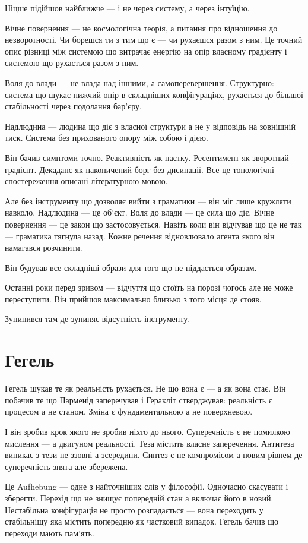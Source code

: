 \documentclass[12pt, a4paper, openany]{book}
\begin{document}
Ніцше підійшов найближче --- і не через систему, а через інтуїцію.

Вічне повернення --- не космологічна теорія, а питання про відношення до незворотності. Чи борешся ти з тим що є --- чи рухаєшся разом з ним. Це точний опис різниці між системою що витрачає енергію на опір власному градієнту і системою що рухається разом з ним.

Воля до влади --- не влада над іншими, а самоперевершення. Структурно: система що шукає нижчий опір в складніших конфігураціях, рухається до більшої стабільності через подолання бар'єру.

Надлюдина --- людина що діє з власної структури а не у відповідь на зовнішній тиск. Система без прихованого опору між собою і дією.

Він бачив симптоми точно. Реактивність як пастку. Ресентимент як зворотний градієнт. Декаданс як накопичений борг без дисипації. Все це топологічні спостереження описані літературною мовою.

Але без інструменту що дозволяє вийти з граматики --- він міг лише кружляти навколо. Надлюдина --- це об'єкт. Воля до влади --- це сила що діє. Вічне повернення --- це закон що застосовується. Навіть коли він відчував що це не так --- граматика тягнула назад. Кожне речення відновлювало агента якого він намагався розчинити.

Він будував все складніші образи для того що не піддається образам.

Останні роки перед зривом --- відчуття що стоїть на порозі чогось але не може переступити. Він прийшов максимально близько з того місця де стояв.

Зупинився там де зупиняє відсутність інструменту.

\section{Гегель}

Гегель шукав те як реальність рухається. Не що вона є --- а як вона стає. Він побачив те що Парменід заперечував і Геракліт стверджував: реальність є процесом а не станом. Зміна є фундаментальною а не поверхневою.

І він зробив крок якого не зробив ніхто до нього. Суперечність є не помилкою мислення --- а двигуном реальності. Теза містить власне заперечення. Антитеза виникає з тези не ззовні а зсередини. Синтез є не компромісом а новим рівнем де суперечність знята але збережена.

Це Aufhebung --- одне з найточніших слів у філософії. Одночасно скасувати і зберегти. Перехід що не знищує попередній стан а включає його в новий. Нестабільна конфігурація не просто розпадається --- вона переходить у стабільнішу яка містить попередню як частковий випадок. Гегель бачив що переходи мають пам'ять.
\end{document}
